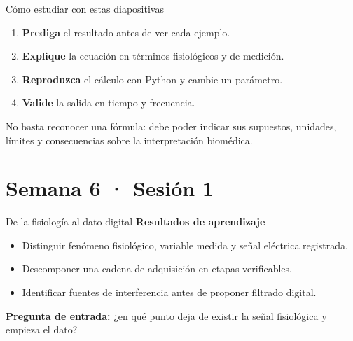 \documentclass[
  ignorenonframetext,
  aspectratio=169,
  spanish,
  professionalfonts]{beamer}
\providecommand{\tightlist}{%
  \setlength{\itemsep}{0pt}\setlength{\parskip}{0pt}}
\begin{document}
\begin{frame}{Cómo estudiar con estas diapositivas}
\protect{}\label{cuxf3mo-estudiar-con-estas-diapositivas}
\begin{enumerate}
\tightlist
\item
  \textbf{Prediga} el resultado antes de ver cada ejemplo.
\item
  \textbf{Explique} la ecuación en términos fisiológicos y de medición.
\item
  \textbf{Reproduzca} el cálculo con Python y cambie un parámetro.
\item
  \textbf{Valide} la salida en tiempo y frecuencia.
\end{enumerate}

\begin{tcolorbox}[enhanced jigsaw, arc=.35mm, bottomrule=.15mm, bottomtitle=1mm, breakable, colback=white, colbacktitle=quarto-callout-note-color!10!white, colframe=quarto-callout-note-color-frame, coltitle=black, left=2mm, leftrule=.75mm, opacityback=0, opacitybacktitle=0.6, rightrule=.15mm, title={Criterio de dominio}, titlerule=0mm, toprule=.15mm, toptitle=1mm]

No basta reconocer una fórmula: debe poder indicar sus supuestos,
unidades, límites y consecuencias sobre la interpretación biomédica.

\end{tcolorbox}
\end{frame}

\section{Semana 6 · Sesión 1}\label{semana-6-sesiuxf3n-1}

\begin{frame}{De la fisiología al dato digital}
\protect{}\label{de-la-fisiologuxeda-al-dato-digital}
\textbf{Resultados de aprendizaje}

\begin{itemize}
\tightlist
\item
  Distinguir fenómeno fisiológico, variable medida y señal eléctrica
  registrada.
\item
  Descomponer una cadena de adquisición en etapas verificables.
\item
  Identificar fuentes de interferencia antes de proponer filtrado
  digital.
\end{itemize}

\textbf{Pregunta de entrada:} ¿en qué punto deja de existir la señal
fisiológica y empieza el dato?
\end{frame}
\end{document}
